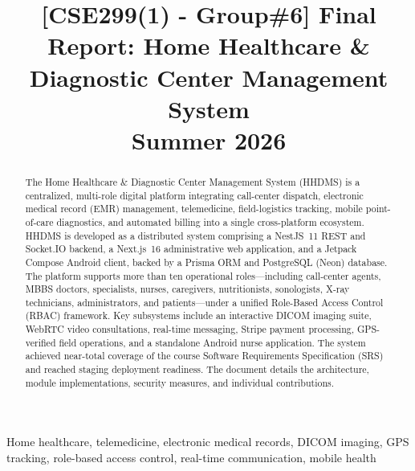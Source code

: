 \documentclass[conference]{IEEEtran}
\begin{document}
\title{[CSE299(1) - Group\#6] Final Report: Home Healthcare \& Diagnostic Center Management System\\
{\large Summer 2026}
}

\author{
}

\maketitle

\begin{abstract}
The Home Healthcare \& Diagnostic Center Management System (HHDMS) is a centralized, multi-role digital platform integrating call-center dispatch, electronic medical record (EMR) management, telemedicine, field-logistics tracking, mobile point-of-care diagnostics, and automated billing into a single cross-platform ecosystem. HHDMS is developed as a distributed system comprising a NestJS~11 REST and Socket.IO backend, a Next.js~16 administrative web application, and a Jetpack Compose Android client, backed by a Prisma ORM and PostgreSQL (Neon) database. The platform supports more than ten operational roles---including call-center agents, MBBS doctors, specialists, nurses, caregivers, nutritionists, sonologists, X-ray technicians, administrators, and patients---under a unified Role-Based Access Control (RBAC) framework. Key subsystems include an interactive DICOM imaging suite, WebRTC video consultations, real-time messaging, Stripe payment processing, GPS-verified field operations, and a standalone Android nurse application. The system achieved near-total coverage of the course Software Requirements Specification (SRS) and reached staging deployment readiness. The document details the architecture, module implementations, security measures, and individual contributions.
\end{abstract}

\begin{IEEEkeywords}
Home healthcare, telemedicine, electronic medical records, DICOM imaging, GPS tracking, role-based access control, real-time communication, mobile health
\end{IEEEkeywords}
\end{document}
